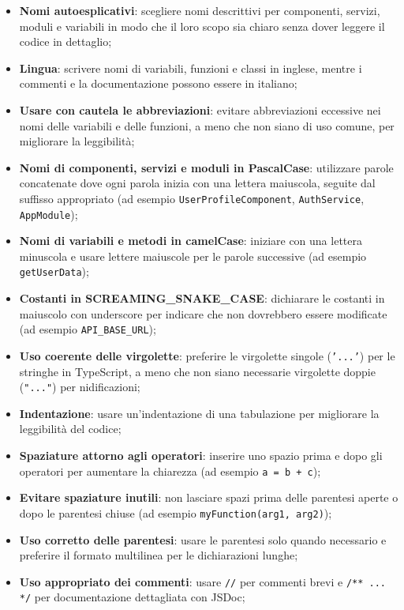 \begin{itemize}
    \item \textbf{Nomi autoesplicativi}: scegliere nomi descrittivi per componenti, servizi, moduli e variabili in modo che il loro scopo sia chiaro senza dover leggere il codice in dettaglio;
    \item \textbf{Lingua}: scrivere nomi di variabili, funzioni e classi in inglese, mentre i commenti e la documentazione possono essere in italiano;
    \item \textbf{Usare con cautela le abbreviazioni}: evitare abbreviazioni eccessive nei nomi delle variabili e delle funzioni, a meno che non siano di uso comune, per migliorare la leggibilità;
    \item \textbf{Nomi di componenti, servizi e moduli in PascalCase}: utilizzare parole concatenate dove ogni parola inizia con una lettera maiuscola, seguite dal suffisso appropriato (ad esempio \texttt{UserProfileComponent}, \texttt{AuthService}, \texttt{AppModule});
    \item \textbf{Nomi di variabili e metodi in camelCase}: iniziare con una lettera minuscola e usare lettere maiuscole per le parole successive (ad esempio \texttt{getUserData});
    \item \textbf{Costanti in SCREAMING\_SNAKE\_CASE}: dichiarare le costanti in maiuscolo con underscore per indicare che non dovrebbero essere modificate (ad esempio \texttt{API\_BASE\_URL});
    \item \textbf{Uso coerente delle virgolette}: preferire le virgolette singole (\texttt{'...'}) per le stringhe in TypeScript, a meno che non siano necessarie virgolette doppie (\texttt{"..."}) per nidificazioni;
    \item \textbf{Indentazione}: usare un'indentazione di una tabulazione per migliorare la leggibilità del codice;
    \item \textbf{Spaziature attorno agli operatori}: inserire uno spazio prima e dopo gli operatori per aumentare la chiarezza (ad esempio \texttt{a = b + c});
    \item \textbf{Evitare spaziature inutili}: non lasciare spazi prima delle parentesi aperte o dopo le parentesi chiuse (ad esempio \texttt{myFunction(arg1, arg2)});
    \item \textbf{Uso corretto delle parentesi}: usare le parentesi solo quando necessario e preferire il formato multilinea per le dichiarazioni lunghe;
    \item \textbf{Uso appropriato dei commenti}: usare \texttt{//} per commenti brevi e \texttt{/** ... */} per documentazione dettagliata con JSDoc;

\end{itemize}
